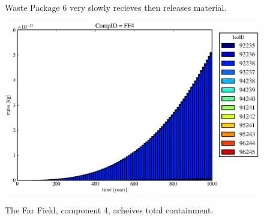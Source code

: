 \begin{figure}[ht]
\begin{minipage}[b]{0.45\linewidth}
  \caption[Case ODI Waste Package Contaminants.]{ 
    Waste Package 6 very slowly recieves then releases material. 
    }
  \label{fig:drIVwp6}
  \includegraphics[width=\textwidth]{./images/od0.eps}
  \caption[Case ODI Waste Package Contaminants.]{ 
    The Far Field, component 4, acheives total containment.
    }
  \label{fig:drIVff0}


  \end{minipage}
\end{figure}

